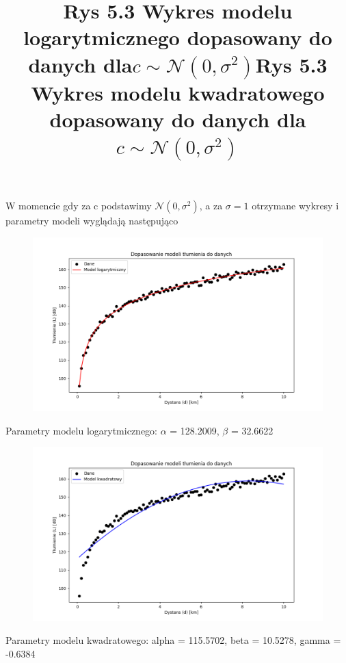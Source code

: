 \documentclass{article}
\begin{document}
W momencie gdy za c podstawimy $ \mathcal{N}(0, \sigma^2)$, a za $\sigma =1$ otrzymane wykresy i parametry modeli wyglądają następująco
\begin{figure}[h]
  \includegraphics[scale=0.4]{logarN.png}
  \title{Rys 5.3 Wykres modelu logarytmicznego dopasowany do danych dla\( c \sim \mathcal{N}(0, \sigma^2) \)}
  \centering
\end{figure}
\newline
Parametry modelu logarytmicznego: $\alpha$ = 128.2009, $\beta$ = 32.6622 \newpage
\begin{figure}[h]
  \includegraphics[scale=0.4]{kwadratN.png}
  \title{Rys 5.3 Wykres modelu kwadratowego dopasowany do danych dla \( c \sim \mathcal{N}(0, \sigma^2) \)}
  \centering
\end{figure}
Parametry modelu kwadratowego: alpha = 115.5702, beta = 10.5278, gamma = -0.6384 \newpage
\end{document}
